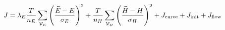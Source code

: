 \documentclass[12pt]{article}
\begin{document}
\fontsize{23}{29}\selectfont\[
J=\lambda_E\frac{T}{n_E}\sum_{\mathcal V_E}\left(\frac{\widehat E-E}{\sigma_E}\right)^2+\frac{T}{n_H}\sum_{\mathcal V_H}\left(\frac{\widehat H-H}{\sigma_H}\right)^2+J_{\rm curve}+J_{\rm init}+J_{\rm flow}
\]
\end{document}
